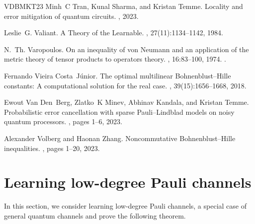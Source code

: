 \documentclass[11pt]{article}
\theoremstyle{plain}
\theoremstyle{plain}
\theoremstyle{definition}
\theoremstyle{remark}
\theoremstyle{named}
\begin{document}
\begin{thebibliography}{VDBMKT23}
Minh~C Tran, Kunal Sharma, and Kristan Temme.
\newblock Locality and error mitigation of quantum circuits.
, 2023.

Leslie~G. Valiant.
\newblock A {T}heory of the {L}earnable.
, 27(11):1134--1142, 1984.

N.~Th. Varopoulos.
\newblock On an inequality of von {N}eumann and an application of the metric
  theory of tensor products to operators theory.
, 16:83--100, 1974.
\newblock \href {https://doi.org/10.1016/0022-1236(74)90071-8}
  {}.

Fernando Vieira Costa~J{\'u}nior.
\newblock The optimal multilinear {B}ohnenblust--{H}ille constants: {A}
  computational solution for the real case.
,
  39(15):1656--1668, 2018.

Ewout Van Den~Berg, Zlatko~K Minev, Abhinav Kandala, and Kristan Temme.
\newblock Probabilistic error cancellation with sparse {P}auli--{L}indblad
  models on noisy quantum processors.
, pages 1--6, 2023.

Alexander Volberg and Haonan Zhang.
\newblock Noncommutative {B}ohnenblust--{H}ille inequalities.
, pages 1--20, 2023.

\end{thebibliography}

\appendix
\section{Learning low-degree Pauli channels}
In this section, we consider learning low-degree Pauli channels, a special case of general quantum channels and prove the following theorem.
\learnPauliChannels*
\end{document}
